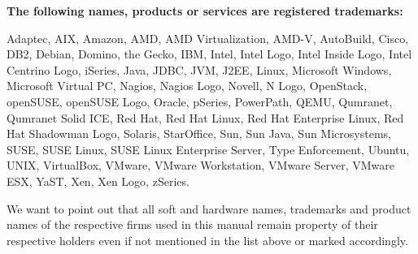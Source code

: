 \textbf{The following names, products or services are registered trademarks:}

\vspace{0.2cm}

Adaptec, AIX, Amazon, AMD, AMD Virtualization, AMD-V, AutoBuild, Cisco, DB2, Debian, Domino, the Gecko, IBM, Intel, Intel Logo, Intel Inside Logo, Intel Centrino Logo, iSeries, Java, JDBC, JVM, J2EE, Linux, Microsoft Windows, Microsoft Virtual PC, Nagios, Nagios Logo, Novell, N Logo, OpenStack, openSUSE, openSUSE Logo, Oracle, pSeries, PowerPath, QEMU, Qumranet, Qumranet Solid ICE, Red Hat, Red Hat Linux, Red Hat Enterprise Linux, Red Hat Shadowman Logo, Solaris, StarOffice, Sun, Sun Java, Sun Microsystems, SUSE, SUSE Linux, SUSE Linux Enterprise Server, Type Enforcement, Ubuntu, UNIX, VirtualBox, VMware, VMware Workstation, VMware Server, VMware ESX, YaST, Xen, Xen Logo, zSeries.

\vspace{0.5cm}

We want to point out that all soft and hardware names, trademarks and product names of the respective firms used in this manual remain property of their respective holders even if not mentioned in the list above or marked accordingly.

